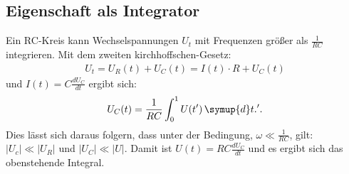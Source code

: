 \subsection{Eigenschaft als Integrator}
Ein RC-Kreis kann Wechselspannungen $U_t$ mit Frequenzen größer als $\frac{1}{RC}$ integrieren.
Mit dem zweiten kirchhoffschen-Gesetz:
\begin{align}
  U_t=U_R(t)+U_C(t)=I(t)\cdot R+U_C(t)
\end{align}
und $I(t)=C\frac{dU_C}{dt}$
ergibt sich:
\begin{equation}
  U_C(t)=\frac{1}{RC}\int_{0}^{1} U(t') \, \symup{d}t.'\label{eqn:integration}.
\end{equation}
Dies lässt sich daraus folgern, dass unter der Bedingung, $\omega\ll\frac{1}{RC}$, gilt: $\lvert U_c \rvert \ll \lvert U_R \rvert$ und $\lvert U_C \rvert \ll \lvert U \rvert$.
Damit ist $U(t)=RC\frac{dU_C}{dt}$ und es ergibt sich das obenstehende Integral.
